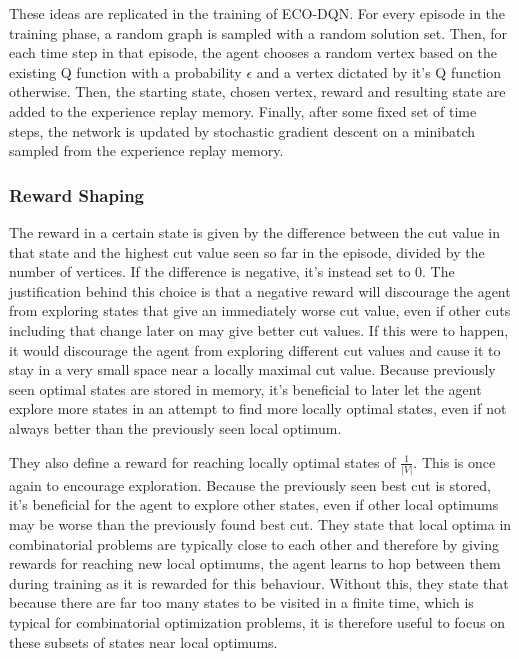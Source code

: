 \documentclass{article}
\begin{document}
These ideas are replicated in the training of ECO-DQN. For every episode in the training phase, a random graph is sampled with a random solution set. Then, for each time step in that episode, the agent chooses a random vertex based on the existing Q function with a probability $\epsilon$ and a vertex dictated by it's Q function otherwise. Then, the starting state, chosen vertex, reward and resulting state are added to the experience replay memory. Finally, after some fixed set of time steps, the network is updated by stochastic gradient descent on a minibatch sampled from the experience replay memory.

\subsubsection{Reward Shaping}

The reward in a certain state is given by the difference between the cut value in that state and the highest cut value seen so far in the episode, divided by the number of vertices. If the difference is negative, it's instead set to 0. The justification behind this choice is that a negative reward will discourage the agent from exploring states that give an immediately worse cut value, even if other cuts including that change later on may give better cut values. If this were to happen, it would discourage the agent from exploring different cut values and cause it to stay in a very small space near a locally maximal cut value. Because previously seen optimal states are stored in memory, it's beneficial to later let the agent explore more states in an attempt to find more locally optimal states, even if not always better than the previously seen local optimum.

They also define a reward for reaching locally optimal states of $\frac{1}{|V|}$. This is once again to encourage exploration. Because the previously seen best cut is stored, it's beneficial for the agent to explore other states, even if other local optimums may be worse than the previously found best cut. They state that local optima in combinatorial problems are typically close to each other and therefore by giving rewards for reaching new local optimums, the agent learns to hop between them during training as it is rewarded for this behaviour. Without this, they state that because there are far too many states to be visited in a finite time, which is typical for combinatorial optimization problems, it is therefore useful to focus on these subsets of states near local optimums.
\end{document}
